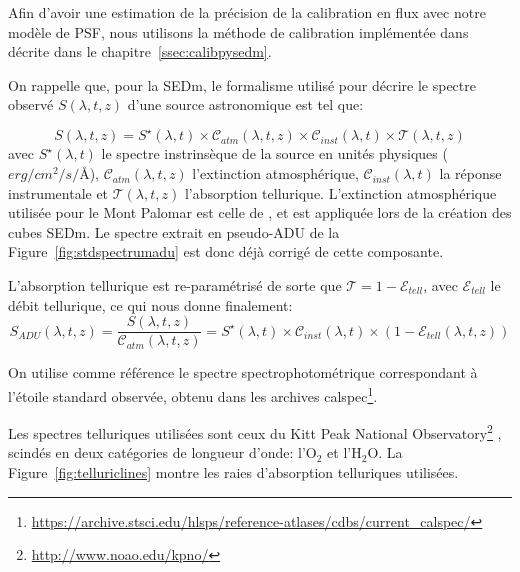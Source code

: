 \documentclass[../main/main.tex]{subfiles}
\begin{document}
Afin d'avoir une estimation de la précision de la calibration en flux
avec notre modèle de PSF, nous utilisons la
méthode de calibration implémentée dans  \citep{pysedm} décrite dans le
chapitre~\ref{ssec:calibpysedm}.

On rappelle que, pour la SEDm, le formalisme utilisé pour décrire le
spectre observé $S(\lambda,t,z)$ d'une source astronomique est tel que:

\begin{equation*} 
  S(\lambda,t,z)=S^{\star}(\lambda,t)\times\mathcal{C}_{atm}(\lambda,t,z)\times\mathcal{C}_{inst}(\lambda,t)\times\mathcal{T}(\lambda,t,z)
\end{equation*}
avec $S^{\star}(\lambda,t)$ le spectre instrinsèque de la source en
unités physiques ($erg/cm^2/s/$\AA), $\mathcal{C}_{atm}(\lambda,t,z)$
l'extinction atmosphérique, $\mathcal{C}_{inst}(\lambda,t)$ la réponse
instrumentale et $\mathcal{T}(\lambda,t,z)$ l'absorption tellurique. L'extinction
atmosphérique utilisée pour le Mont Palomar est celle de
\citep{Hayes1975atm}, et est appliquée lors de la création des cubes
SEDm. Le spectre extrait en pseudo-ADU de la
Figure~\ref{fig:stdspectrumadu} est donc déjà corrigé de cette composante.

L'absorption tellurique est re-paramétrisé de sorte que $\mathcal{T} =
1-\mathcal{E}_{tell}$, avec $\mathcal{E}_{tell}$ le débit tellurique, ce qui nous donne finalement:
\begin{equation*} 
  S_{ADU}(\lambda,t,z) = \frac{S(\lambda,t,z)}{\mathcal{C}_{atm}(\lambda,t,z)}=S^{\star}(\lambda,t)\times\mathcal{C}_{inst}(\lambda,t)\times\left(1-\mathcal{E}_{tell}(\lambda,t,z)\right)
\end{equation*}

On utilise comme référence le spectre spectrophotométrique
correspondant à l'étoile standard observée, obtenu dans les archives
calspec\footnote{\url{https://archive.stsci.edu/hlsps/reference-atlases/cdbs/current_calspec/}}.

Les spectres
telluriques utilisées sont ceux du Kitt Peak National
Observatory\footnote{\url{http://www.noao.edu/kpno/}} \citep{Hinkle2003}, scindés en deux
catégories de longueur d'onde: l'$\text{O}_{2}$ et
l'$\text{H}_{2}\text{O}$. La Figure~\ref{fig:telluriclines} montre les
raies d'absorption telluriques utilisées.
\end{document}
